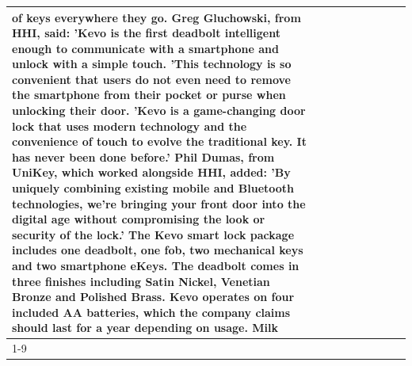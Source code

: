 \begin{table}[H]
\begin{tabular}{lllrlllll}
of keys everywhere they go. Greg Gluchowski, from HHI, said: 'Kevo is the first deadbolt intelligent enough to communicate with a smartphone and unlock with a simple touch. 'This technology is so convenient that users do not even need to remove the smartphone from their pocket or purse when unlocking their door. 'Kevo is a game-changing door lock that uses modern technology and the convenience of touch to evolve the traditional key. It has never been done before.' Phil Dumas, from UniKey, which worked alongside HHI, added: 'By uniquely combining existing mobile and Bluetooth technologies, we’re bringing your front door into the digital age without compromising the look or security of the lock.' The Kevo smart lock package includes one deadbolt, one fob, two mechanical keys and two smartphone eKeys. The deadbolt comes in three finishes including Satin Nickel, Venetian Bronze and Polished Brass. Kevo operates on four included AA batteries, which the company claims should last for a year depending on usage. Milk \\
\cline{1-9}

\end{tabular}
\end{table}
